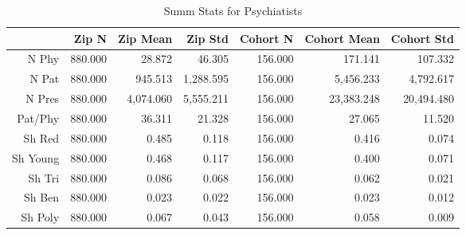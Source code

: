 \begin{table}[h]
\centering
\caption{Summ Stats for Psychiatists} 
\begin{tabular}{rrrrrrr}
  \hline
 & Zip N & Zip Mean & Zip Std & Cohort N & Cohort Mean & Cohort Std \\ 
  \hline
N Phy & 880.000 & 28.872 & 46.305 & 156.000 & 171.141 & 107.332 \\ 
   \hline
N Pat & 880.000 & 945.513 & 1,288.595 & 156.000 & 5,456.233 & 4,792.617 \\ 
   \hline
N Pres & 880.000 & 4,074.060 & 5,555.211 & 156.000 & 23,383.248 & 20,494.480 \\ 
   \hline
Pat/Phy & 880.000 & 36.311 & 21.328 & 156.000 & 27.065 & 11.520 \\ 
   \hline
Sh Red & 880.000 & 0.485 & 0.118 & 156.000 & 0.416 & 0.074 \\ 
   \hline
Sh Young & 880.000 & 0.468 & 0.117 & 156.000 & 0.400 & 0.071 \\ 
   \hline
Sh Tri & 880.000 & 0.086 & 0.068 & 156.000 & 0.062 & 0.021 \\ 
   \hline
Sh Ben & 880.000 & 0.023 & 0.022 & 156.000 & 0.023 & 0.012 \\ 
   \hline
Sh Poly & 880.000 & 0.067 & 0.043 & 156.000 & 0.058 & 0.009 \\ 
   \hline
\end{tabular}
\end{table}
